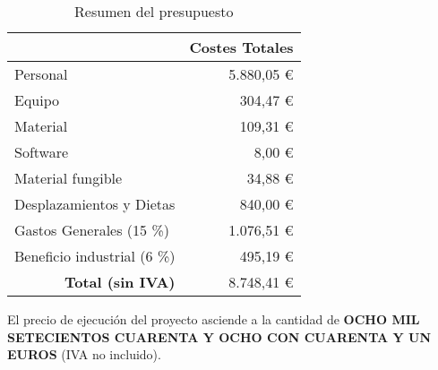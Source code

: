 \begin{table}[H]
	\centering
	\caption{Resumen del presupuesto}
	\label{tab:presupuesto_total}
	\begin{tabular}{l|r|}
		\hline
		\rowcolor[HTML]{BFBFBF}
		\multicolumn{1}{|c|}{\cellcolor[HTML]{BFBFBF}\textbf{Presupuestos}} & \multicolumn{1}{c|}{\cellcolor[HTML]{BFBFBF}\textbf{Costes Totales}} \\ \hline
		\multicolumn{1}{|l|}{Personal}                                      & 5.880,05 €                                                           \\ \hline
		\multicolumn{1}{|l|}{Equipo}                                        & 304,47 €                                                             \\ \hline
		\multicolumn{1}{|l|}{Material}                                      & 109,31 €                                                             \\ \hline
		\multicolumn{1}{|l|}{Software}                                      & 8,00 €                                                               \\ \hline
		\multicolumn{1}{|l|}{Material fungible}                             & 34,88 €                                                              \\ \hline
		\multicolumn{1}{|l|}{Desplazamientos y Dietas}                      & 840,00 €                                                             \\ \hline
		\multicolumn{1}{|l|}{Gastos Generales (15 \%)}                       & 1.076,51 €                                                           \\ \hline
		\multicolumn{1}{|l|}{Beneficio industrial (6 \%)}                    & 495,19 €                                                             \\ \hline
		\multicolumn{1}{r|}{\textbf{Total (sin IVA)}}                       & 8.748,41 €                                                           \\ \cline{2-2}
	\end{tabular}
\end{table}

\noindent
El precio de ejecución del proyecto asciende a la cantidad de \MakeUppercase{\textbf{ocho mil setecientos cuarenta y ocho con cuarenta y un euros}} (IVA no incluido).